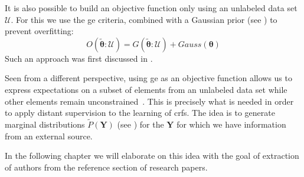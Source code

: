 It is also possible to build an \gls{objective function} only using an unlabeled data set $\mathcal{U}$.
For this we use the \gls{ge} criteria, combined with a Gaussian prior (see ) to prevent overfitting:
\begin{equation}
  \label{equ:objective-function-g}
  O(\mathbf{\tilde{\theta}}:\mathcal{U})=G(\mathbf{\tilde{\theta}}:\mathcal{U})+Gauss(\mathbf{\theta})
\end{equation}
Such an approach was first discussed in \citet{mann2008generalized}.

Seen from a different perspective, using \gls{ge} as an objective function allows us to express expectations on a subset of elements from an unlabeled data set while other elements remain unconstrained~\citep{mann2010generalized}.
This is precisely what is needed in order to apply \gls{distant supervision} to the learning of \glspl{crf}.
The idea is to generate \glspl{marginal distribution} $\tilde{P}(\mathbf{Y})$ (see ) for the $\mathbf{Y}$ for which we have information from an external source.

In the following chapter we will elaborate on this idea with the goal of extraction of authors from the reference section of research papers.

